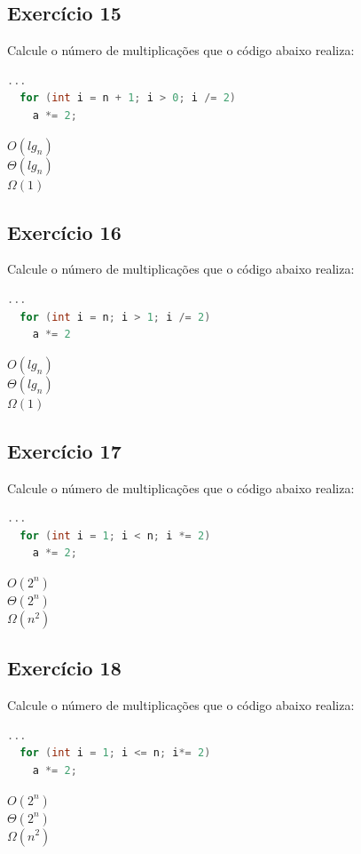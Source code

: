 \documentclass[12pt]{article}
\begin{document}
\subsection{Exercício 15}
Calcule o número de multiplicações que o código abaixo realiza:
\begin{lstlisting}[language=C]
  ...
  for (int i = n + 1; i > 0; i /= 2)
    a *= 2;
\end{lstlisting}
$O(lg_n)$\\
$\Theta(lg_n)$\\
$\Omega(1)$\\




\subsection{Exercício 16}
Calcule o número de multiplicações que o código abaixo realiza:
\begin{lstlisting}[language=C]
  ...
  for (int i = n; i > 1; i /= 2)
    a *= 2
\end{lstlisting}
$O(lg_n)$\\
$\Theta(lg_n)$\\
$\Omega(1)$\\




\subsection{Exercício 17}
Calcule o número de multiplicações que o código abaixo realiza:
\begin{lstlisting}[language=C]
  ...
  for (int i = 1; i < n; i *= 2)
    a *= 2;
\end{lstlisting}
$O(2^n)$\\
$\Theta(2^n)$\\
$\Omega(n^2)$\\

\subsection{Exercício 18}
Calcule o número de multiplicações que o código abaixo realiza:
\begin{lstlisting}[language=C]
  ...
  for (int i = 1; i <= n; i*= 2)
    a *= 2;
\end{lstlisting}
$O(2^n)$\\
$\Theta(2^n)$\\
$\Omega(n^2)$\\



\end{document}
